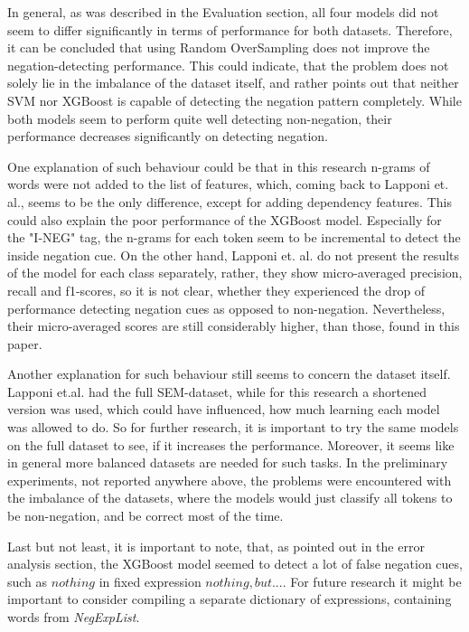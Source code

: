 In general, as was described in the Evaluation section, all four models did not seem to differ significantly in terms of performance for both datasets. Therefore, it can be concluded that using Random OverSampling does not improve the negation-detecting performance. This could indicate, that the problem does not solely lie in the imbalance of the dataset itself, and rather points out that neither SVM nor XGBoost is capable of detecting the negation pattern completely. While both models seem to perform quite well detecting non-negation, their performance decreases significantly on detecting negation. 

One explanation of such behaviour could be that in this research n-grams of words were not added to the list of features, which, coming back to  Lapponi et. al.\cite{lapponi2012uio}, seems to be the only difference, except for adding dependency features. This could also explain the poor performance of the XGBoost model. Especially for the "I-NEG" tag, the n-grams for each token seem to be incremental to detect the inside negation cue. On the other hand, Lapponi et. al. do not present the results of the model for each class separately, rather, they show micro-averaged precision, recall and f1-scores, so it is not clear, whether they experienced the drop of performance detecting negation cues as opposed to non-negation. Nevertheless, their micro-averaged scores are still considerably higher, than those, found in this paper.  

Another explanation for such behaviour still seems to concern the dataset itself. Lapponi et.al. had the full SEM-dataset, while for this research a shortened version was used, which could have influenced, how much learning each model was allowed to do. So for further research, it is important to try the same models on the full dataset to see, if it increases the performance. Moreover, it seems like in general more balanced datasets are needed for such tasks. In the preliminary experiments, not reported anywhere above, the problems were encountered with the imbalance of the datasets, where the models would just classify all tokens to be non-negation, and be correct most of the time. 

Last but not least, it is important to note, that, as pointed out in the error analysis section, the XGBoost model seemed to detect a lot of false negation cues, such as $nothing$ in fixed expression $nothing, but ...$. For future research it might be important to consider compiling a separate dictionary of expressions, containing words from \textit{NegExpList}. 
